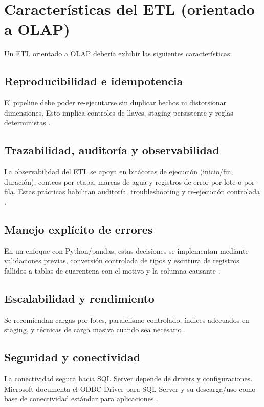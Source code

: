 \documentclass[12pt]{article}
\begin{document}
\section{Características del ETL (orientado a OLAP)}
Un ETL orientado a OLAP debería exhibir las siguientes características:

\subsection{Reproducibilidad e idempotencia}
El pipeline debe poder re-ejecutarse sin duplicar hechos ni distorsionar dimensiones. Esto implica controles de llaves, staging persistente y reglas deterministas \cite{kimball_etl_toolkit}.

\subsection{Trazabilidad, auditoría y observabilidad}
La observabilidad del ETL se apoya en bitácoras de ejecución (inicio/fin, duración), conteos por etapa, marcas de agua y registros de error por lote o por fila. Estas prácticas habilitan auditoría, troubleshooting y re-ejecución controlada \cite{kimball_etl_toolkit}.

\subsection{Manejo explícito de errores}
En un enfoque con Python/pandas, estas decisiones se implementan mediante validaciones previas, conversión controlada de tipos y escritura de registros fallidos a tablas de cuarentena con el motivo y la columna causante \cite{kimball_etl_toolkit}.

\subsection{Escalabilidad y rendimiento}
Se recomiendan cargas por lotes, paralelismo controlado, índices adecuados en staging, y técnicas de carga masiva cuando sea necesario \cite{kimball_etl_toolkit}.

\subsection{Seguridad y conectividad}
La conectividad segura hacia SQL Server depende de drivers y configuraciones. Microsoft documenta el ODBC Driver para SQL Server y su descarga/uso como base de conectividad estándar para aplicaciones \cite{ms_odbc_driver,ms_odbc_download}.
\end{document}
